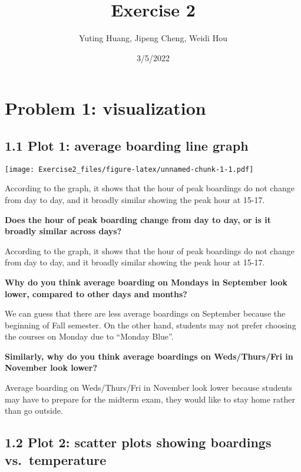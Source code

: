 \documentclass[
]{article}
\title{Exercise 2}
\author{Yuting Huang, Jipeng Cheng, Weidi Hou}
\date{3/5/2022}
\begin{document}
\maketitle

\hypertarget{problem-1-visualization}{%
\section{Problem 1: visualization}\label{problem-1-visualization}}

\hypertarget{plot-1-average-boarding-line-graph}{%
\subsection{1.1 Plot 1: average boarding line
graph}\label{plot-1-average-boarding-line-graph}}

\texttt{[image: Exercise2\_files/figure-latex/unnamed-chunk-1-1.pdf]}

According to the graph, it shows that the hour of peak boardings do not
change from day to day, and it broadly similar showing the peak hour at
15-17.

\textbf{Does the hour of peak boarding change from day to day, or is it
broadly similar across days?}

According to the graph, it shows that the hour of peak boardings do not
change from day to day, and it broadly similar showing the peak hour at
15-17.

\textbf{Why do you think average boarding on Mondays in September look
lower, compared to other days and months?}

We can guess that there are less average boardings on September because
the beginning of Fall semester. On the other hand, students may not
prefer choosing the courses on Monday due to ``Monday Blue''.

\textbf{Similarly, why do you think average boardings on Weds/Thurs/Fri
in November look lower?}

Average boarding on Weds/Thurs/Fri in November look lower because
students may have to prepare for the midterm exam, they would like to
stay home rather than go outside.

\hypertarget{plot-2-scatter-plots-showing-boardings-vs.-temperature}{%
\subsection{1.2 Plot 2: scatter plots showing boardings
vs.~temperature}\label{plot-2-scatter-plots-showing-boardings-vs.-temperature}}
\end{document}
